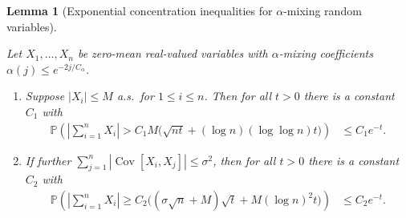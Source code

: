 \documentclass[11pt,lof]{puthesis}
\renewcommand{\P}{\ensuremath{\mathbb{P}}}
\DeclareMathOperator{\Cov}{Cov}
\theoremstyle{break}
\newtheorem{lemma}{Lemma}[section]
\theoremstyle{proof}
\begin{document}
\begin{lemma}[Exponential concentration inequalities for
  \texorpdfstring{$\alpha$}{alpha}-mixing random variables]
  \label{lem:yurinskii_app_exponential_mixing}

  Let $X_1, \ldots, X_n$ be zero-mean real-valued
  variables with $\alpha$-mixing coefficients
  $\alpha(j) \leq e^{-2 j / C_\alpha}$.

  \begin{enumerate}[label=(\roman*)]

    \item
      \label{it:yurinskii_app_exponential_mixing_bounded}
      Suppose $|X_i| \leq M$ a.s.\ for $1 \leq i \leq n$.
      Then for all $t > 0$ there is a constant $C_1$ with
      \begin{align*}
        \P\left(
          \left|
            \sum_{i=1}^n
            X_i
          \right|
          > C_1 M \big( \sqrt{n t}
          + (\log n)(\log \log n) t \big)
        \right)
        &\leq
        C_1 e^{-t}.
      \end{align*}
    \item
      \label{it:yurinskii_app_exponential_mixing_bernstein}
      If further $\sum_{j=1}^n |\Cov[X_i, X_j]| \leq \sigma^2$,
      then for all $t > 0$ there is a constant $C_2$ with
      \begin{align*}
        \P\left(
          \left|
            \sum_{i=1}^n
            X_i
          \right|
          \geq C_2 \big( (\sigma \sqrt n + M) \sqrt t
          + M (\log n)^2 t \big)
        \right)
        &\leq
        C_2 e^{-t}.
      \end{align*}

  \end{enumerate}

\end{lemma}
\end{document}
